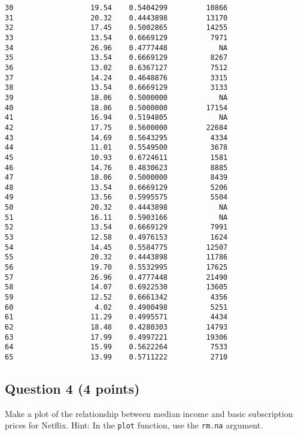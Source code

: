 \documentclass[
]{article}
\newenvironment{Shaded}{\begin{snugshade}}{\end{snugshade}}
\newcommand{\AttributeTok}[1]{\textcolor[rgb]{0.13,0.29,0.53}{#1}}
\newcommand{\ConstantTok}[1]{\textcolor[rgb]{0.56,0.35,0.01}{#1}}
\newcommand{\FunctionTok}[1]{\textcolor[rgb]{0.13,0.29,0.53}{\textbf{#1}}}
\newcommand{\NormalTok}[1]{#1}
\newcommand{\OtherTok}[1]{\textcolor[rgb]{0.56,0.35,0.01}{#1}}
\newcommand{\SpecialCharTok}[1]{\textcolor[rgb]{0.81,0.36,0.00}{\textbf{#1}}}
\begin{document}
\begin{verbatim}
30                  19.54    0.5404299         10866
31                  20.32    0.4443898         13170
32                  17.45    0.5002865         14255
33                  13.54    0.6669129          7971
34                  26.96    0.4777448            NA
35                  13.54    0.6669129          8267
36                  13.02    0.6367127          7512
37                  14.24    0.4648876          3315
38                  13.54    0.6669129          3133
39                  18.06    0.5000000            NA
40                  18.06    0.5000000         17154
41                  16.94    0.5194805            NA
42                  17.75    0.5600000         22684
43                  14.69    0.5643295          4334
44                  11.01    0.5549500          3678
45                  10.93    0.6724611          1581
46                  14.76    0.4830623          8885
47                  18.06    0.5000000          8439
48                  13.54    0.6669129          5206
49                  13.56    0.5995575          5504
50                  20.32    0.4443898            NA
51                  16.11    0.5903166            NA
52                  13.54    0.6669129          7991
53                  12.58    0.4976153          1624
54                  14.45    0.5584775         12507
55                  20.32    0.4443898         11786
56                  19.70    0.5532995         17625
57                  26.96    0.4777448         21490
58                  14.07    0.6922530         13605
59                  12.52    0.6661342          4356
60                   4.02    0.4900498          5251
61                  11.29    0.4995571          4434
62                  18.48    0.4280303         14793
63                  17.99    0.4997221         19306
64                  15.99    0.5622264          7533
65                  13.99    0.5711222          2710
\end{verbatim}

\subsection{Question 4 (4 points)}\label{question-4-4-points-1}

Make a plot of the relationship between median income and basic
subscription prices for Netflix. Hint: In the \texttt{plot} function,
use the \texttt{rm.na} argument.

\begin{Shaded}
\end{Shaded}
\end{document}
